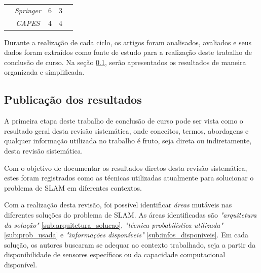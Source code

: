 \begin{table}[H]
\begin{tabular}{@{}c|c|c|c|c@{}}
                                 & \textit{Springer}                                                                   & 6                & 3                     &                                                                                                                                                                                              \\ \cline{2-4}
                                 & \textit{CAPES}                                                                      & 4                & 4                     &                                                                                                                                                                                              \\ \hline
\end{tabular}
\end{table}

Durante a realização de cada ciclo, os artigos foram analisados, avaliados e seus dados foram extraídos como fonte de estudo para a realização deste trabalho de conclusão de curso. Na seção \ref{sub:publicacaoRevisao}, serão apresentados os resultados de maneira organizada e simplificada.


	\subsection{Publicação dos resultados} %
	\label{sub:publicacaoRevisao}
		
		A primeira etapa deste trabalho de conclusão de curso pode ser vista como o resultado geral desta revisão sistemática, onde conceitos, termos, abordagens e qualquer informação utilizada no trabalho é fruto, seja direta ou indiretamente, desta revisão sistemática.

		Com o objetivo de documentar os resultados diretos desta revisão sistemática, estes foram registrados como as técnicas utilizadas atualmente para solucionar o problema de SLAM em diferentes contextos. 

		Com a realização desta revisão, foi possível identificar \textit{áreas} mutáveis nas diferentes soluções do problema de SLAM. As áreas identificadas são \textit{"arquitetura da solução"} \ref{sub:arquitetura_solucao}, \textit{"técnica probabilística utilizada"} \ref{sub:prob_usada} e \textit{"informações disponíveis"} \ref{sub:infos_disponiveis}. Em cada solução, os autores buscaram se adequar ao contexto trabalhado, seja a partir da disponibilidade de sensores específicos ou da capacidade computacional disponível.


